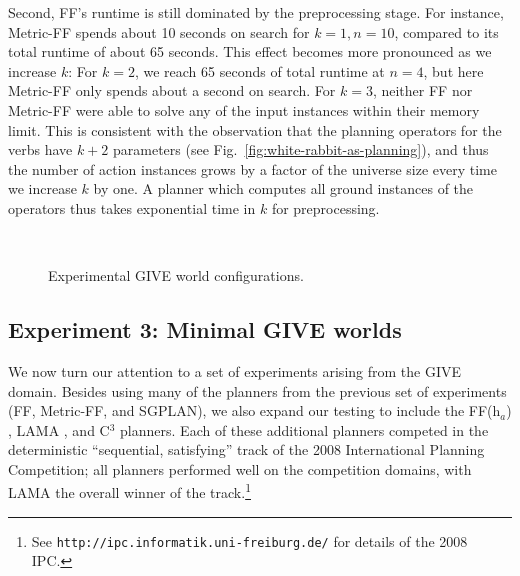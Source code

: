 Second, FF's runtime is still dominated by the preprocessing
stage. For instance, Metric-FF spends about 10 seconds on search for
$k=1,n=10$, compared to its total runtime of about 65 seconds. This
effect becomes more pronounced as we increase $k$: For $k=2$, we reach
65 seconds of total runtime at $n=4$, but here Metric-FF only spends
about a second on search. For $k=3$, neither FF nor Metric-FF were
able to solve any of the input instances within their memory
limit. This is consistent with the observation that the planning
operators for the verbs have $k+2$ parameters (see
Fig.~\ref{fig:white-rabbit-as-planning}), and thus the number of
action instances grows by a factor of the universe size every time we
increase $k$ by one. A planner which computes all ground instances of
the operators thus takes exponential time in $k$ for preprocessing.

\begin{figure}[t]
  \centering
  \qquad
   \\
  \caption{Experimental GIVE world configurations.}
  \label{fig:give-maps}
\end{figure}


\subsection{Experiment 3: Minimal GIVE worlds}
\label{sec:exper-3:-minim}

We now turn our attention to a set of experiments arising from the GIVE domain.
Besides using many of the planners from the previous set of experiments (FF,
Metric-FF, and SGPLAN), we also expand our testing to include the FF(h$_a$)
\citep{keyder08:_ff_h_plann_for_plann}, LAMA \citep{richter08:_lama_plann}, and
C$^3$ \citep{lipovetzky08:_c3} planners. Each of these additional planners
competed in the deterministic ``sequential, satisfying'' track of the 2008
International Planning Competition; all planners performed well on the
competition domains, with LAMA the overall winner of the track.\footnote{See
\texttt{http://ipc.informatik.uni-freiburg.de/} for details of the 2008 IPC.}

